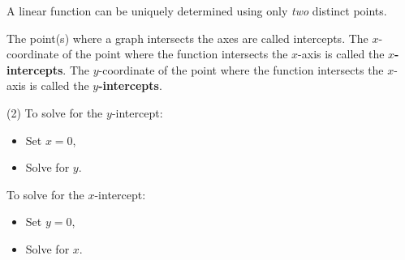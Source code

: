 \documentclass[../mathNotesPreamble]{subfiles}
\begin{document}
    \begin{center}
      A linear function can be uniquely determined using only \emph{two} distinct points.
    \end{center}
    \begin{defn*}
      The point(s) where a graph intersects the axes are called intercepts. The $x$-coordinate of the point where the function intersects the $x$-axis is called the \textbf{$x$-intercepts}. The $y$-coordinate of the point where the function intersects the $x$-axis is called the \textbf{$y$-intercepts}.
    \end{defn*}
    \begin{tasks}[label=\textbullet](2)
      \task To solve for the $y$-intercept:
        \begin{itemize}
          \item Set $x=0$,
          \item Solve for $y$.
        \end{itemize}
      \task To solve for the $x$-intercept:
        \begin{itemize}
          \item Set $y=0$,
          \item Solve for $x$.
        \end{itemize}
    \end{tasks}
    \pagebreak
\end{document}
